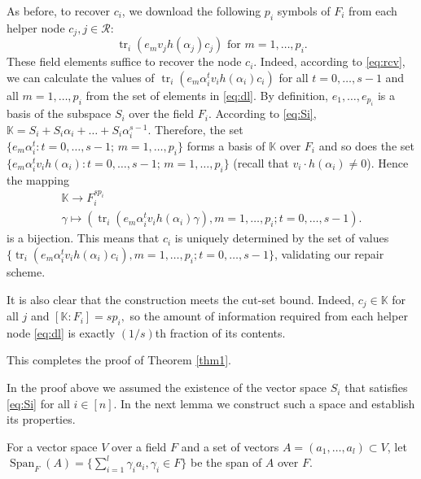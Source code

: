 \documentclass[11pt,onecolumn]{IEEEtran}
\newcommand{\cR}{\mathcal{R}}
\DeclareMathOperator{\trace}{tr}
\DeclareMathOperator{\spun}{Span}
\begin{document}
\begin{IEEEproof}
As before, to recover $c_i$, we download the following $p_i$ symbols of $F_i$ from each helper node  $c_j, j\in \cR$:
\begin{equation}\label{eq:dl}
\trace_i(e_m v_j h(\alpha_j) c_j) \text{~for~} m=1,\dots,p_i.
\end{equation}
These field elements suffice to recover the node $c_i$. Indeed, according to \eqref{eq:rcv}, we can calculate the values of 
$\trace_{i}(e_m \alpha_i^t v_i h(\alpha_i)c_i)$ for all $t=0,\dots,s-1$ and all $m=1,\dots,p_i$ from the set of elements in \eqref{eq:dl}.
By definition, $e_1,\dots,e_{p_i}$ is a basis of the subspace $S_i$ over the field $F_i$.
According to \eqref{eq:Si}, {
 $\mathbb{K} = S_i + S_i\alpha_i+\dots + S_i\alpha_i^{s-1}$.  }
Therefore, the set $\{e_m\alpha_i^t:  t=0,\dots,s-1 ;\, m=1,\dots,p_i\}$ forms a basis of  $\mathbb{K}$ over  $F_i$
and so does the set  $\{e_m\alpha_i^t v_i h(\alpha_i):  t=0,\dots,s-1 ;\, m=1,\dots,p_i\}$ (recall that $v_i\cdot h(\alpha_i)\neq 0$).
Hence the mapping %
 $$
   \begin{array}{ll}
   \mathbb{K}\to F_i^{s p_i}\\
\gamma \mapsto (\trace_{i}(e_m \alpha_i^t v_i h(\alpha_i) \gamma), m=1,\dots,p_i; t=0,\dots,s-1).
  \end{array}
   $$ 
 is a bijection. 
This means that $c_i$ is uniquely determined by the set of values $\{\trace_{i}(e_m \alpha_i^t v_i h(\alpha_i) c_i),m=1,\dots,p_i; t=0,\dots,s-1\}$, validating our repair scheme.

It is also clear that the construction meets the cut-set bound. Indeed, $c_j\in\mathbb{K}$ for all $j$
 and $[\mathbb{K}:F_i]=sp_i,$ so
the amount of information required from each helper node \eqref{eq:dl} is exactly $(1/s)$th fraction of its contents.

This completes the proof of Theorem \ref{thm1}.
\end{IEEEproof}



In the proof above we assumed the existence of the vector space $S_i$ that satisfies \eqref{eq:Si} for all $i\in[n]$.
In the next lemma we construct such a space and establish its properties. 


For a vector space $V$ over a field $F$ and a set of vectors $A=(a_1,\dots,a_l)\subset V$, let $\spun_F(A)=\{\sum_{i=1}^l \gamma_ia_i, \gamma_i\in F\}$ be the span of $A$
 over $F$.
\end{document}
